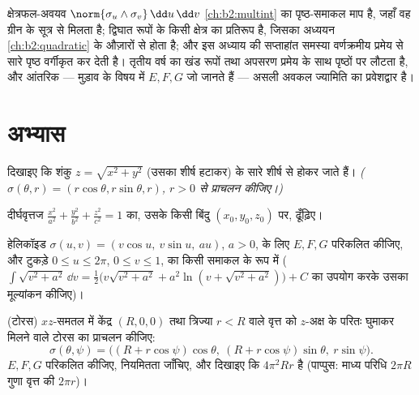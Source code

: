 \begin{remark}[यह कहाँ काम आता है]
क्षेत्रफल-अवयव $\norm{\sigma_u\wedge\sigma_v}\,\dd u\,\dd v$ \cref{ch:b2:multint} का पृष्ठ-समाकल माप है, जहाँ वह ग्रीन
के सूत्र से मिलता है;  द्विघात रूपों के किसी क्षेत्र
का प्रतिरूप है, जिसका  अध्ययन \cref{ch:b2:quadratic} के औज़ारों से होता है;
और इस अध्याय की सप्ताहांत समस्या वर्णक्रमीय प्रमेय से सारे 
पृष्ठ वर्गीकृत कर देती है। तृतीय वर्ष का खंड  रूपों तथा अपसरण
प्रमेय के साथ पृष्ठों पर लौटता है, और आंतरिक  --- मुड़ाव के
विषय में $E, F, G$ जो जानते हैं --- असली अवकल ज्यामिति का प्रवेशद्वार है।
\end{remark}

\section{अभ्यास}

\begin{exercise}[$\star$]\label{exo:b2:surfaces:1}
दिखाइए कि शंकु $z = \sqrt{x^2 + y^2}$ (उसका शीर्ष हटाकर) के सारे  शीर्ष
से होकर जाते हैं। \emph{($\sigma(\theta, r) = (r\cos\theta, r\sin\theta, r)$, $r > 0$ से प्राचलन कीजिए।)}
\end{exercise}

\begin{exercise}[$\star$]\label{exo:b2:surfaces:2}
दीर्घवृत्तज $\frac{x^2}{a^2} +
\frac{y^2}{b^2} + \frac{z^2}{c^2} = 1$ का, उसके किसी बिंदु $(x_0, y_0,
z_0)$ पर, 
ढूँढ़िए।
\end{exercise}

\begin{exercise}[$\star$]\label{exo:b2:surfaces:3}
हेलिकॉइड $\sigma(u, v) = (v\cos u,\
v\sin u,\ au)$, $a > 0$, के लिए $E, F, G$ परिकलित कीजिए, और टुकड़े $0 \leq u \leq
2\pi$,
$0 \leq v \leq 1$, का  किसी समाकल के रूप में ($\int\sqrt{v^2 + a^2}\,\dd v = \frac12\bigl(v\sqrt{v^2+a^2} +
a^2\ln(v + \sqrt{v^2 + a^2})\bigr) + C$ का उपयोग करके उसका
मूल्यांकन कीजिए)।
\end{exercise}

\begin{exercise}[$\star\star$]\label{exo:b2:surfaces:4}
(टोरस) $xz$-समतल में केंद्र $(R, 0, 0)$ तथा त्रिज्या $r < R$ वाले वृत्त को
$z$-अक्ष के परितः घुमाकर मिलने वाले टोरस का प्राचलन कीजिए:
\[
\sigma(\theta, \psi) = \bigl((R + r\cos\psi)\cos\theta,\
(R + r\cos\psi)\sin\theta,\ r\sin\psi\bigr).
\]
$E, F, G$ परिकलित कीजिए, नियमितता जाँचिए, और दिखाइए कि 
$4\pi^2 R r$ है (पाप्पुस: माध्य परिधि $2\pi R$ गुणा वृत्त की  $2\pi r$)।
\end{exercise}

